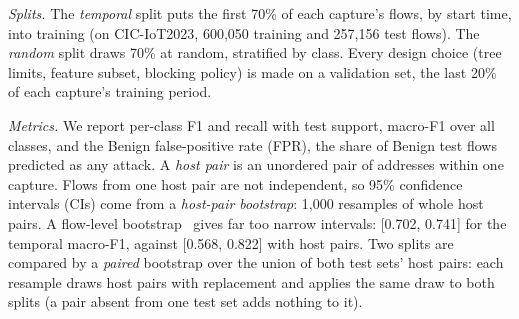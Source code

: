\emph{Splits.} The \emph{temporal} split puts the first 70\% of each capture's flows, by start time, into training (on CIC-IoT2023, 600,050 training and 257,156 test flows). The \emph{random} split draws 70\% at random, stratified by class. Every design choice (tree limits, feature subset, blocking policy) is made on a validation set, the last 20\% of each capture's training period.

\emph{Metrics.} We report per-class F1 and recall with test support, macro-F1 over all classes, and the Benign false-positive rate (FPR), the share of Benign test flows predicted as any attack. A \emph{host pair} is an unordered pair of addresses within one capture. Flows from one host pair are not independent, so 95\% confidence intervals (CIs) come from a \emph{host-pair bootstrap}: 1,000 resamples of whole host pairs. A flow-level bootstrap~\cite{efron1994bootstrap} gives far too narrow intervals: [0.702, 0.741] for the temporal macro-F1, against [0.568, 0.822] with host pairs. Two splits are compared by a \emph{paired} bootstrap over the union of both test sets' host pairs: each resample draws host pairs with replacement and applies the same draw to both splits (a pair absent from one test set adds nothing to it).
